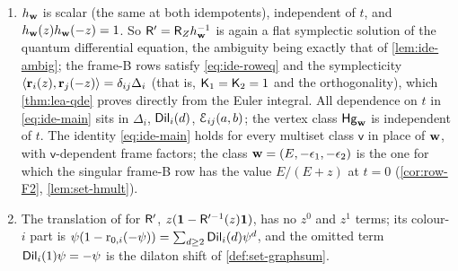 \begin{rmk}
\label{rmk:ide-frame}
\begin{enumerate}
\item $h_{\mathbf{w}}$ is scalar (the same at both idempotents), independent of $t$, and $h_{\mathbf{w}}(z)h_{\mathbf{w}}(-z)=1$. So $\mathsf{R}'=\mathsf{R}_{Z}h_{\mathbf{w}}^{-1}$ is again a flat symplectic solution of the quantum differential equation, the ambiguity being exactly that of \cref{lem:ide-ambig}; the frame-B rows satisfy \cref{eq:ide-roweq} and the symplecticity $\langle\mathbf{r}_i(z),\mathbf{r}_j(-z)\rangle=\delta_{ij}\Delta_i$ (that is, $\mathsf{K}_{1}=\mathsf{K}_{2}=1$ and the orthogonality), which \cref{thm:lea-qde} proves directly from the Euler integral. All dependence on $t$ in \cref{eq:ide-main} sits in $\Delta_i$, $\mathsf{Dil}_i(d)$, $\mathcal{E}_{ij}(a,b)$; the vertex class $\mathsf{Hg}_{\mathbf{w}}$ is independent of $t$. The identity \cref{eq:ide-main} holds for every multiset class $\mathsf{v}$ in place of $\mathbf{w}$, with $\mathsf{v}$-dependent frame factors; the class $\mathbf{w}=(E,-\epsilon_1,-\epsilon_2)$ is the one for which the singular frame-B row has the value $E/(E+z)$ at $t=0$ (\cref{cor:row-F2}, \cref{lem:set-hmult}).
\item The translation of \cite[Def.~2.13]{PPZ15} for $\mathsf{R}'$, $z(\mathbf{1}-\mathsf{R}'^{-1}(z)\mathbf{1})$, has no $z^0$ and $z^1$ terms; its colour-$i$ part is $\psi(1-\mathrm{r}_{0,i}(-\psi))=\sum_{d\geq 2}\mathsf{Dil}_i(d)\psi^d$, and the omitted term $\mathsf{Dil}_i(1)\psi=-\psi$ is the dilaton shift of \cref{def:set-graphsum}.
\end{enumerate}
\end{rmk}
